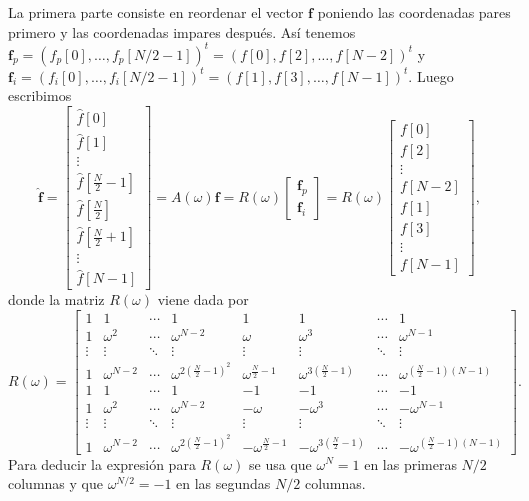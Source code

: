 \documentclass[12pt, a4paper]{amsbook}
\newcommand{\ff}{{\mathbf f}}
\theoremstyle{remark}
\theoremstyle{definition}
\numberwithin{section}{chapter}
\numberwithin{subsection}{section}
\numberwithin{equation}{section}
\numberwithin{figure}{chapter}
\begin{document}
La primera parte consiste en reordenar el vector $\ff$ poniendo las coordenadas pares primero y las coordenadas impares después. Así tenemos $\ff_p = (f_p[0],\dots,f_p[N/2-1])^t = (f[0], f[2],\dots,f[N-2])^t$ y $\ff_i = (f_i[0],\dots,f_i[N/2-1])^t = (f[1], f[3], \dots, f[N-1])^t$. Luego escribimos
$$
\hat \ff = \begin{bmatrix}
\hat f[0]\\
\hat f[1]\\
\vdots\\
\hat f[\tfrac{N}{2}-1]\\
\hat f[\tfrac{N}{2}]\\
\hat f[\tfrac{N}{2}+1]\\
\vdots \\
\hat f[N-1]
\end{bmatrix} = 
A(\omega)\ff = 
R(\omega) \begin{bmatrix}
\ff_p\\
\ff_i
\end{bmatrix} = 
R(\omega) \begin{bmatrix}
f[0]\\
f[2]\\
\vdots\\
f[N-2]\\
f[1]\\
f[3]\\
\vdots\\
f[N-1]
\end{bmatrix},
$$
donde la matriz $R(\omega)$ viene dada por
$$
R(\omega)= \begin{bmatrix}
1 & 1 & \cdots & 1 & 1 & 1 & \cdots & 1\\
1 & \omega^2 & \cdots & \omega^{N-2} & \omega & \omega^3 & \cdots & \omega^{N-1}\\
\vdots & \vdots & \ddots & \vdots & \vdots & \vdots & \ddots & \vdots\\
1 & \omega^{N-2} & \cdots & \omega^{2(\frac{N}{2}-1)^2} & \omega^{\frac{N}{2}-1} & \omega^{3(\frac{N}{2}-1)} & \cdots &\omega^{(\frac{N}{2}-1)(N-1)}\\
1 & 1 & \cdots & 1 & -1 & -1 & \cdots & -1\\
1 & \omega^2 & \cdots & \omega^{N-2} & -\omega & -\omega^3 & \cdots & -\omega^{N-1}\\
\vdots & \vdots & \ddots & \vdots & \vdots & \vdots & \ddots & \vdots\\
1 & \omega^{N-2} & \cdots & \omega^{2(\frac{N}{2}-1)^2} & -\omega^{\frac{N}{2}-1} &- \omega^{3(\frac{N}{2}-1)} & \cdots & -\omega^{(\frac{N}{2}-1)(N-1)}
\end{bmatrix}.
$$
Para deducir la expresión para $R(\omega)$ se usa que $\omega^N=1$ en las primeras $N/2$ columnas y que $\omega^{N/2}=-1$ en las segundas $N/2$ columnas.
\end{document}
